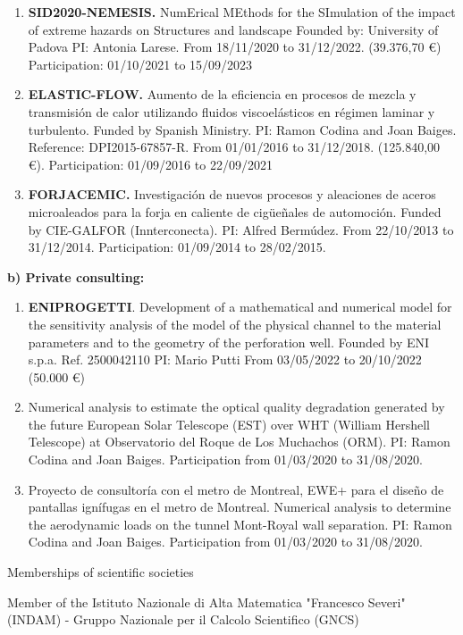 \documentclass[letterpaper,english]{article}
\begin{document}
\begin{cv}{}
\begin{enumerate}
    \item \textbf{SID2020-NEMESIS.} NumErical MEthods for the SImulation of the impact of extreme hazards on Structures and landscape Founded by: University of Padova PI: Antonia Larese. From 18/11/2020 to 31/12/2022. (39.376,70 €)  Participation: 01/10/2021 to 15/09/2023 
    \item \textbf{ELASTIC-FLOW.} Aumento de la eficiencia en procesos de mezcla y transmisión de calor utilizando fluidos viscoelásticos en régimen laminar y turbulento. Funded by Spanish Ministry. PI: Ramon Codina and Joan Baiges. Reference: DPI2015-67857-R. From 01/01/2016 to 31/12/2018. (125.840,00 €).  Participation: 01/09/2016 to 22/09/2021
    \item \textbf{FORJACEMIC.} Investigación de nuevos procesos y aleaciones de aceros microaleados para la forja en caliente de cigüeñales de automoción. Funded by CIE-GALFOR (Innterconecta). PI: Alfred Bermúdez. From 22/10/2013 to 31/12/2014. Participation: 01/09/2014 to 28/02/2015.
\end{enumerate}
\textbf{b) Private consulting:}
\begin{enumerate}
        \item \textbf{ENIPROGETTI}. Development of a mathematical and numerical model for the sensitivity analysis of the model of the physical channel to the material parameters and to the geometry of the perforation well. Founded by ENI s.p.a. Ref. 2500042110 PI: Mario Putti From 03/05/2022 to 20/10/2022 (50.000 €)
        \item Numerical analysis to estimate the optical quality degradation generated by the future European Solar Telescope (EST) over WHT (William Hershell Telescope) at Observatorio del Roque de Los Muchachos (ORM). PI: Ramon Codina and Joan Baiges. Participation from 01/03/2020 to 31/08/2020.
	\item Proyecto de consultoría con el metro de Montreal, EWE+ para el diseño de pantallas ignífugas en el metro de Montreal. Numerical analysis to determine the aerodynamic loads on the tunnel Mont-Royal wall separation. PI: Ramon Codina and Joan Baiges. Participation from 01/03/2020 to 31/08/2020.
\end{enumerate}
\setlength{\cvlabelwidth}{1.5cm}
\begin{cvlist}{Memberships of scientific societies}
    \item[\footnotesize{Since 2023}] Member of the 
Istituto Nazionale di Alta Matematica "Francesco Severi" (INDAM) - Gruppo Nazionale per il Calcolo Scientifico (GNCS)

\end{cvlist}
\end{cv}
\end{document}
